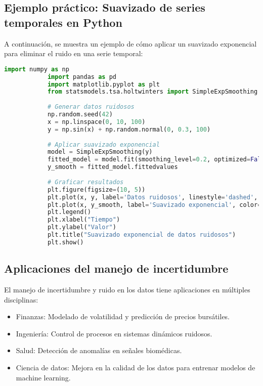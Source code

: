 \begin{itemize}
		\subsection{Ejemplo práctico: Suavizado de series temporales en Python}
		
		A continuación, se muestra un ejemplo de cómo aplicar un suavizado exponencial para eliminar el ruido en una serie temporal:
		
		\begin{lstlisting}[language=Python, caption={Suavizado exponencial en Python}]
			import numpy as np
			import pandas as pd
			import matplotlib.pyplot as plt
			from statsmodels.tsa.holtwinters import SimpleExpSmoothing
			
			# Generar datos ruidosos
			np.random.seed(42)
			x = np.linspace(0, 10, 100)
			y = np.sin(x) + np.random.normal(0, 0.3, 100)
			
			# Aplicar suavizado exponencial
			model = SimpleExpSmoothing(y)
			fitted_model = model.fit(smoothing_level=0.2, optimized=False)
			y_smooth = fitted_model.fittedvalues
			
			# Graficar resultados
			plt.figure(figsize=(10, 5))
			plt.plot(x, y, label='Datos ruidosos', linestyle='dashed', alpha=0.5)
			plt.plot(x, y_smooth, label='Suavizado exponencial', color='red')
			plt.legend()
			plt.xlabel("Tiempo")
			plt.ylabel("Valor")
			plt.title("Suavizado exponencial de datos ruidosos")
			plt.show()
		\end{lstlisting}
		
		\subsection{Aplicaciones del manejo de incertidumbre}
		
		El manejo de incertidumbre y ruido en los datos tiene aplicaciones en múltiples disciplinas:
		
		\begin{itemize}
			\item Finanzas: Modelado de volatilidad y predicción de precios bursátiles.
			\item Ingeniería: Control de procesos en sistemas dinámicos ruidosos.
			\item Salud: Detección de anomalías en señales biomédicas.
			\item Ciencia de datos: Mejora en la calidad de los datos para entrenar modelos de machine learning.
		\end{itemize}

\end{itemize}
